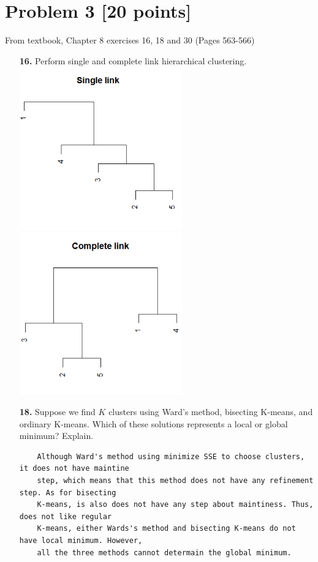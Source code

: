 \documentclass{article}
\begin{document}
  \section*{Problem 3 [20 points]} 
From textbook, Chapter 8 exercises 16, 18 and 30 (Pages 563-566)
\begin{enumerate}
	\item[\textbf{16.}] Perform single and complete link hierarchical clustering.
	\\
	\includegraphics[width=7cm]{8-a.png}
	\includegraphics[width=7cm]{8-b.png}
	
	\item[\textbf{18.}] Suppose we find $K$ clusters using Ward’s method, bisecting K-means, and ordinary K-means. Which of these solutions represents a local or global minimum? Explain.
	\begin{verbatim}
	Although Ward's method using minimize SSE to choose clusters, it does not have maintine 
	step, which means that this method does not have any refinement step. As for bisecting 
	K-means, is also does not have any step about maintiness. Thus, does not like regular 
	K-means, either Wards's method and bisecting K-means do not have local minimum. However, 
	all the three methods cannot determain the global minimum. 
	

\end{verbatim}
\end{enumerate}
\end{document}
